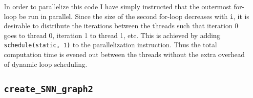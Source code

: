 \documentclass[reprint, english,notitlepage,nofootinbib]{revtex4-1}  %
\begin{document}
In order to parallelize this code I have simply instructed that the outermost for-loop be run in parallel. Since the size of the second for-loop decreases with \verb|i|, it is desirable to distribute the iterations between the threads such that iteration 0 goes to thread 0, iteration 1 to thread 1, etc. This is achieved by adding \verb|schedule(static, 1)| to the parallelization instruction. Thus the total computation time is evened out between the threads without the extra overhead of dynamic loop scheduling.


\subsection{\texttt{create\_SNN\_graph2}}




\onecolumngrid
\vspace{1cm} %
\newpage

% 
\end{document}
